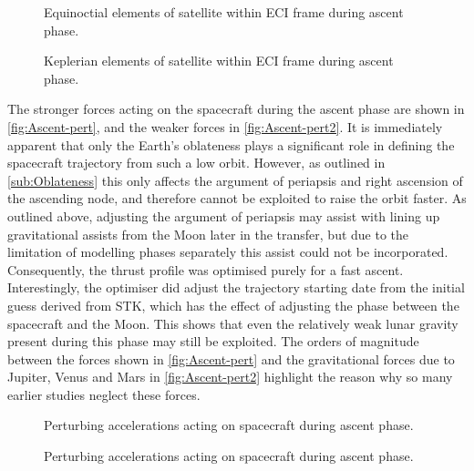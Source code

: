 \begin{figure}
\centering
\def\svgwidth{\figurewidth}

\caption{Equinoctial elements of satellite within ECI frame during ascent phase.}
\label{fig:Ascent-mee}
\end{figure}

\begin{figure}
\centering
\def\svgwidth{\figurewidth}

\caption{Keplerian elements of satellite within ECI frame during ascent phase.}
\label{fig:Ascent-kep}
\end{figure}

The stronger forces acting on the spacecraft during the ascent phase are shown in \autoref{fig:Ascent-pert}, and the weaker forces in \autoref{fig:Ascent-pert2}. It is immediately apparent that only the Earth's oblateness plays a significant role in defining the spacecraft trajectory from such a low orbit. However, as outlined in \autoref{sub:Oblateness} this only affects the argument of periapsis and right ascension of the ascending node, and therefore cannot be exploited to raise the orbit faster. As outlined above, adjusting the argument of periapsis may assist with lining up gravitational assists from the Moon later in the transfer, but due to the limitation of modelling phases separately this assist could not be incorporated. Consequently, the thrust profile was optimised purely for a fast ascent. Interestingly, the optimiser did adjust the trajectory starting date from the initial guess derived from STK, which has the effect of adjusting the phase between the spacecraft and the Moon. This shows that even the relatively weak lunar gravity present during this phase may still be exploited. The orders of magnitude between the forces shown in \autoref{fig:Ascent-pert} and the gravitational forces due to Jupiter, Venus and Mars in \autoref{fig:Ascent-pert2} highlight the reason why so many earlier studies neglect these forces. 

\begin{figure}
\centering
\def\svgwidth{\figurewidth}

\caption{Perturbing accelerations acting on spacecraft during ascent phase.}
\label{fig:Ascent-pert}
\end{figure}

\begin{figure}
\centering
\def\svgwidth{\figurewidth}

\caption{Perturbing accelerations acting on spacecraft during ascent phase.}
\label{fig:Ascent-pert2}
\end{figure}

